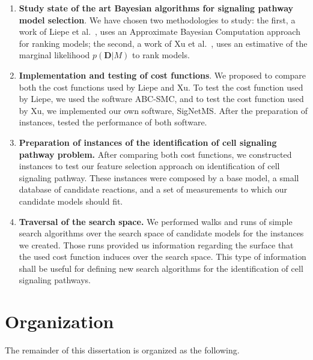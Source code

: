 \begin{enumerate}
    \item{{\bf Study state of the art Bayesian algorithms for signaling
        pathway model selection}. We have chosen two methodologies to
        study: the first, a work of Liepe et al.~\cite{Liepe2014}, uses
        an Approximate Bayesian Computation approach for ranking models;
        the second, a work of Xu et al.~\cite{Xura20}, uses an
        estimative of the marginal likelihood $p({\bm D}| M)$ to rank
        models.}
    \item{{\bf Implementation and testing of cost functions}. We proposed
        to compare both the cost functions used by Liepe and Xu. To test
        the cost function used by Liepe, we used the software
        ABC-SMC, and to test the cost function used by Xu, we
        implemented our own software, SigNetMS. After the preparation of
        instances, tested the performance of both software.}
    \item{{\bf Preparation of instances of the identification of cell
        signaling pathway problem.} After comparing both cost functions,
        we constructed instances to test our feature selection
        approach on identification of cell signaling pathway. These
        instances were composed by a base model, a small database of
        candidate reactions, and a set of measurements to which our
        candidate models should fit.}
    \item{{\bf Traversal of the search space.} We performed
        walks and runs of simple search algorithms over the search space
        of candidate models for the instances we created. Those runs
        provided us information regarding the surface that the used cost 
        function induces over the search space. This type of information
        shall be useful for defining new search algorithms for the
        identification of cell signaling pathways.}
\end{enumerate}

\section{Organization}

The remainder of this dissertation is organized as the following.

